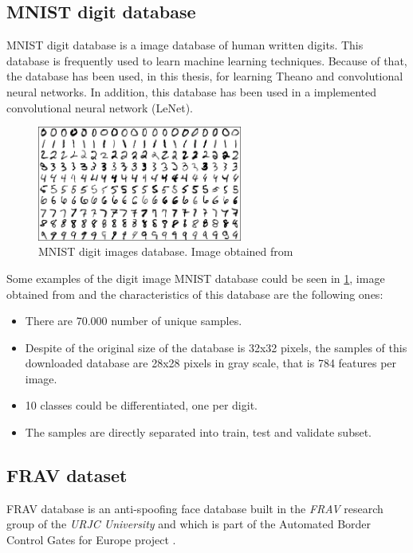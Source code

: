 \subsection{MNIST digit database}\label{subsec:MNIST}
MNIST digit database is a image database of human written digits. This database is frequently used to learn machine learning techniques. Because of that, the database has been used, in this thesis, for learning Theano and convolutional neural networks. In addition, this database has been used in a implemented convolutional neural network (LeNet).\\
\begin{figure}[htb]
\centering
\includegraphics[width=0.6\textwidth]{images_databases/mnistExamples.png}
\caption{MNIST digit images database. Image obtained from \cite{MNISTimage}} \label{fig:MNIST_digits}
\end{figure}
Some examples of the digit image MNIST database could be seen in \ref{fig:MNIST_digits}, image obtained from \cite{MNISTimage} and the characteristics of this database are the following ones:
\begin{itemize}[itemsep=2pt,topsep=8pt,parsep=0pt,partopsep=20pt]
 \item There are 70.000 number of unique samples.
 \item Despite of the original size of the database is 32x32 pixels, the samples of this downloaded database are 28x28 pixels in gray scale, that is 784 features per image.
 \item 10 classes could be differentiated, one per digit.
\item The samples are directly separated into train, test and validate subset.
\end{itemize}

\subsection{FRAV dataset}
FRAV database is an anti-spoofing face database built in the  \textit{FRAV} research group of the \textit{URJC University} and which is part of the Automated Border Control Gates for Europe project \cite{ABC4EU}.\\

